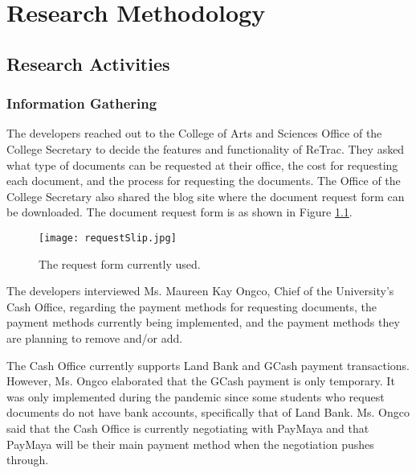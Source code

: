 \chapter{Research Methodology}

\section{Research Activities}

\subsection{Information Gathering}
The developers reached out to the College of Arts and Sciences Office of the College Secretary to decide the features and functionality of ReTrac. They asked what type of documents can be requested at their office, the cost for requesting each document, and the process for requesting the documents. The Office of the College Secretary also shared the blog site where the document request form can be downloaded. The document request form is as shown in Figure \ref{fig:requestSlip}.
\begin{figure}[hb!]
  \caption{\label{fig:requestSlip} The request form currently used.}
  \texttt{[image: requestSlip.jpg]}
\end{figure}

The developers interviewed Ms. Maureen Kay Ongco, Chief of the University's Cash Office, regarding the payment methods for requesting documents, the payment methods currently being implemented, and the payment methods they are planning to remove and/or add. 

The Cash Office currently supports Land Bank and GCash payment transactions. However, Ms. Ongco elaborated that the GCash payment is only temporary. It was only implemented during the pandemic since some students who request documents do not have bank accounts, specifically that of Land Bank. Ms. Ongco said that the Cash Office is currently negotiating with PayMaya and that PayMaya will be their main payment method when the negotiation pushes through.


